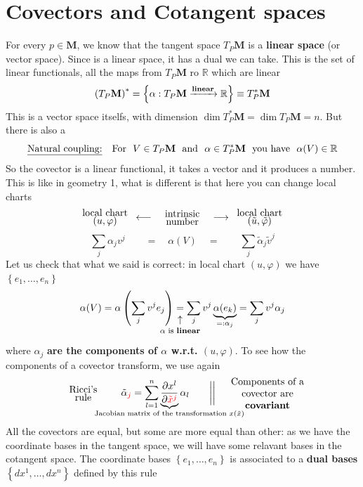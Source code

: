 \documentclass[../main.tex]{subfiles}
\begin{document}
\section{Covectors and Cotangent spaces}
For every $p\in\mathbf{M}$, we know that the tangent space $T_P\mathbf{M}$ is a \textbf{linear space} (or vector space). Since is a linear space, it has a dual we can take. This is the set of linear functionals, all the maps from $T_P\mathbf{M}$ ro $\mathbb{R}$ which are linear
\[
\left(T_P\mathbf{M}\right)^\ast=\left\{\alpha:T_P\mathbf{M}\xrightarrow{\textrm{\textbf{linear}}}\mathbb{R}\right\}\equiv T_P^\ast\mathbf{M}
\]
This is a vector space itselfs, with dimension $\dim{T^\ast_P\mathbf{M}}=\dim T_P\mathbf{M}=n$. But there is also a 
\[
\textrm{\underline{Natural coupling:}} \quad \textrm{For } \ V\in T_P\mathbf{M} \ \textrm{ and }\  \alpha\in T_P^\ast\mathbf{M} \ \textrm{ you have }\  \alpha(V)\in\mathbb{R} 
\]
So the covector is a linear functional, it takes a vector and it produces a number. This is like in geometry 1, what is different is that here you can change local charts
\[
\text{\parbox{2 cm}{\centering local chart \\[-4pt]  $(u,\varphi)$}}\longleftarrow\text{\parbox{2 cm}{\centering intrinsic \\[-4pt]  number}}\longrightarrow\text{\parbox{2 cm}{\centering local chart \\[-4pt] $(\tilde{u},\tilde{\varphi})$}}
\]
\[
\sum_j\alpha_jv^j\qquad =\quad \alpha(V)\quad =\qquad \sum_j\tilde{\alpha}_j\tilde{v}^j
\]
Let us check that what we said is correct: in local chart $(u, \varphi)$ we have $\left\{e_1,\dots,e_n\right\}$
\[
\alpha(V)=\alpha\left(\sum_jv^je_j\right) \underset{\mathclap{\tikz \node {$\uparrow$} node [below=1ex] {\footnotesize $\alpha$ is \textbf{linear}};}}{=} \sum_jv^j\underbrace{\alpha(e_k)}_{=:\alpha_j}= \sum_j v^j\alpha_j
\]
where $\alpha_j$ \textbf{are the components of $\alpha$ w.r.t. $(u,\varphi)$}. To see how the components of a covector transform, we use again
\[
\text{\parbox{2 cm}{\centering Ricci's \\[-4pt]  rule}}\quad \tilde{\alpha}_{\textcolor{red}{j}}=\sum_{l=1}^n\underbrace{\frac{\partial x^l}{\partial\textcolor{red}{\tilde{x}^j}}}_{\mathclap{\text{Jacobian matrix of the transformation $x(\tilde{x})$}}}\alpha_l \qquad \bigg|\bigg| \quad \text{\parbox{3 cm}{\centering Components of a covector are \textbf{covariant}}}
\]
All the covectors are equal, but some are more equal than other: as we have the coordinate bases in the tangent space, we will have some relavant bases in the cotangent space. The coordinate bases \(\left\{e_1,\dots,e_n\right\}\) is associated to a \textbf{dual bases} \(\left\{dx^1,\dots,dx^n\right\}\) defined by this rule
\end{document}
